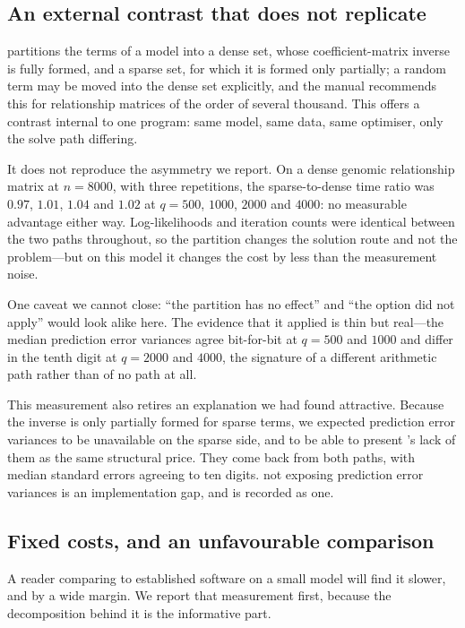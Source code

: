 \documentclass[article]{jss}
\begin{document}
\subsection{An external contrast that does not replicate}\label{sec:external}

 partitions the terms of a model into a dense set, whose
coefficient-matrix inverse is fully formed, and a sparse set, for which it is
formed only partially; a random term may be moved into the dense set
explicitly, and the manual recommends this for relationship matrices of the
order of several thousand. This offers a contrast internal to one program:
same model, same data, same optimiser, only the solve path differing.

It does not reproduce the asymmetry we report. On a dense genomic relationship
matrix at $n = 8000$, with three repetitions, the sparse-to-dense time ratio
was $0.97$, $1.01$, $1.04$ and $1.02$ at $q = 500$, $1000$, $2000$ and $4000$:
no measurable advantage either way. Log-likelihoods and iteration counts were
identical between the two paths throughout, so the partition changes the
solution route and not the problem---but on this model it changes the cost by
less than the measurement noise.

One caveat we cannot close: ``the partition has no effect'' and ``the option
did not apply'' would look alike here. The evidence that it applied is thin
but real---the median prediction error variances agree bit-for-bit at
$q = 500$ and $1000$ and differ in the tenth digit at $q = 2000$ and $4000$,
the signature of a different arithmetic path rather than of no path at all.

This measurement also retires an explanation we had found attractive. Because
the inverse is only partially formed for sparse terms, we expected prediction
error variances to be unavailable on the sparse side, and to be able to
present 's lack of them as the same structural price. They come
back from both paths, with median standard errors agreeing to ten digits.
 not exposing prediction error variances is an implementation gap,
and is recorded as one.

\subsection{Fixed costs, and an unfavourable comparison}\label{sec:fixed}

A reader comparing  to established software on a small model will
find it slower, and by a wide margin. We report that measurement first,
because the decomposition behind it is the informative part.
\end{document}
